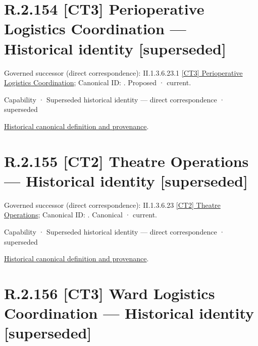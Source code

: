 \section*{R.2.154 [CT3] Perioperative Logistics Coordination — Historical identity [superseded]}
\label{navigation:R.2.154}

{\small Governed successor (direct correspondence): II.1.3.6.23.1 \hyperref[element:6b7c08b60b5b48519bfe4b6f993dd6fb]{[CT3] Perioperative Logistics Coordination}; Canonical ID: \texttt{}. Proposed · current.}\par
\label{element:e7813a06b9df462fa135c299261f192e}
{\small Capability · Superseded historical identity — direct correspondence · superseded}\par
\href{../../../../../../../continuum/strategy/capability/e7813a06b9df462fa135c299261f192e.md}{Historical canonical definition and provenance}.\par
\section*{R.2.155 [CT2] Theatre Operations — Historical identity [superseded]}
\label{navigation:R.2.155}

{\small Governed successor (direct correspondence): II.1.3.6.23 \hyperref[element:4bf7a8260e1444fdac44e97c3557b533]{[CT2] Theatre Operations}; Canonical ID: \texttt{}. Canonical · current.}\par
\label{element:9ac72fea821c45e2b18632ae9a9867dd}
{\small Capability · Superseded historical identity — direct correspondence · superseded}\par
\href{../../../../../../../continuum/strategy/capability/9ac72fea821c45e2b18632ae9a9867dd.md}{Historical canonical definition and provenance}.\par
\section*{R.2.156 [CT3] Ward Logistics Coordination — Historical identity [superseded]}
\label{navigation:R.2.156}

